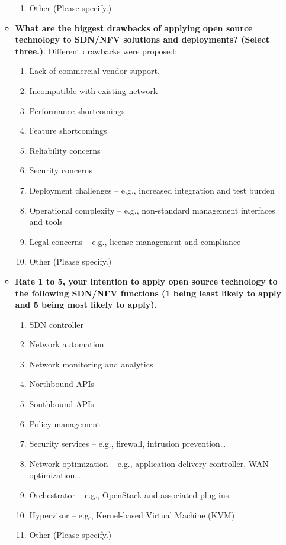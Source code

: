 \documentclass[a4paper, 12pt]{book}
\begin{document}
\begin{enumerate}
\begin{itemize}
\begin{enumerate}
\item{Other (Please specify.)}
\end{enumerate}
\item{\textbf{What are the biggest drawbacks of applying open source technology to SDN/NFV solutions and deployments? (Select three.)}}. Different drawbacks were proposed: 
\begin{enumerate}\itemsep0pt
\item{Lack of commercial vendor support}.
\item{Incompatible with existing network}
\item{Performance shortcomings}
\item{Feature shortcomings}
\item{Reliability concerns}
\item{Security concerns}
\item{Deployment challenges – e.g., increased integration and test burden}
\item{Operational complexity – e.g., non-standard management interfaces and tools}
\item{Legal concerns – e.g., license management and compliance}
\item{Other (Please specify.)}
\end{enumerate}
\item{\textbf{Rate 1 to 5, your intention to apply open source technology to the following SDN/NFV functions (1 being least likely to apply and 5 being most likely to apply).}}
\begin{enumerate}\itemsep0pt
\item{SDN controller}
\item{Network automation}
\item{Network monitoring and analytics}
\item{Northbound APIs}
\item{Southbound APIs}
\item{Policy management}
\item{Security services – e.g., firewall, intrusion prevention…}
\item{Network optimization – e.g., application delivery controller, WAN optimization…}
\item{Orchestrator – e.g., OpenStack and associated plug-ins}
\item{Hypervisor – e.g., Kernel-based Virtual Machine (KVM)}
\item{Other (Please specify.)}
\end{enumerate}
\end{itemize}
\end{enumerate}
\end{document}
